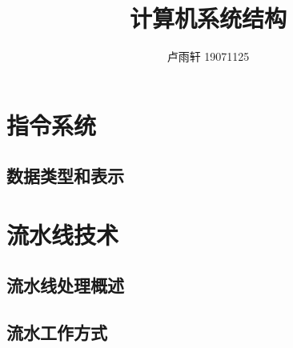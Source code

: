 \documentclass{ctexart}
\title{计算机系统结构}
\author{卢雨轩 19071125}
\begin{document}
\maketitle
\tableofcontents

\section{指令系统}
\subsection{数据类型和表示}

\section{流水线技术}
\subsection{流水线处理概述}
\subsection{流水工作方式}
\end{document}
